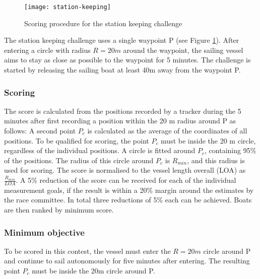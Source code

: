 \documentclass[12pt]{article}
\begin{document}
  \begin{figure}[H]
    \centering
    \texttt{[image: station-keeping]}
    \caption{Scoring procedure for the station keeping challenge}
    \label{fig:stationkeeping}
  \end{figure}

The station keeping challenge uses a single waypoint P
(see Figure \ref{fig:stationkeeping}). After entering a circle with radius $R=20m$ around the waypoint, the 
sailing vessel aims to stay as close as possible to the waypoint for 5 minutes.
The challenge is started by releasing the sailing boat at least 40m away
from the waypoint P.

\subsubsection{Scoring}
The score is calculated from the positions recorded by a tracker during the 5
minutes after first recording a position within the 20 m radius around P as
follows:
A second point $P_c$ is calculated as the average of the coordinates of all
positions. To be qualified for scoring, the point $P_c$ must be
inside the 20 m circle, regardless of the individual positions.
A circle is fitted around $P_c$, containing 95\% of the positions.
The radius of this circle around $P_c$ is $R_{min}$, and this radius is used for
scoring. The score is normalised to the vessel length overall (LOA) as 
$\frac{R_{min}}{LOA}$. 
A 5\% reduction of the score can be received for each of the individual
measurement goals, if the result is within a 20\% margin around 
the estimates by the race committee. In total three reductions of 5\%
each can be achieved. Boats are then ranked by minimum score.

\subsubsection{Minimum objective}
To be scored in this contest, the vessel must enter the $R=20m$ circle around P
and continue to sail autonomously for five minutes after entering. The resulting 
point $P_c$ must be inside the 20m circle around P.
\end{document}
